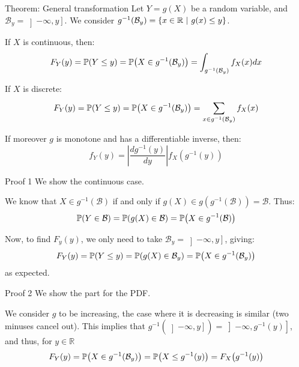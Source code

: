 \documentclass[a4paper]{article}
\begin{document}
\begin{parag}{Theorem: General transformation}
    Let $Y = g\left(X\right)$ be a random variable, and $\mathcal{B}_y = \left]-\infty, y\right] $. We consider $g^{-1}\left(\mathcal{B}_y\right) = \left\{x \in \mathbb{R} \suchthat g\left(x\right) \leq y\right\}$.

    If $X$ is continuous, then: 
    \[F_Y\left(y\right) = \prob\left(Y \leq y\right) = \prob\left(X \in g^{-1}\left(\mathcal{B}_y\right)\right) = \int_{g^{-1}\left(\mathcal{B}_y\right)} f_X\left(x\right)dx\]

    If $X$ is discrete:
    \[F_Y\left(y\right) = \prob\left(Y \leq y\right) = \prob\left(X \in g^{-1}\left(\mathcal{B}_y\right)\right) = \sum_{x \in g^{-1}\left(\mathcal{B}_y\right)}^{} f_X\left(x\right)\]

    If moreover $g$ is monotone and has a differentiable inverse, then: 
    \[f_Y\left(y\right) = \left|\frac{dg^{-1}\left(y\right)}{dy}\right| f_X\left(g^{-1}\left(y\right)\right)\]


    \begin{subparag}{Proof 1}
        We show the continuous case.

        We know that $X \in g^{-1}\left(\mathcal{B}\right)$ if and only if $g\left(X\right) \in g\left(g^{-1}\left(\mathcal{B}\right)\right) = \mathcal{B}$. Thus: 
        \[\prob\left(Y \in \mathcal{B}\right) = \prob\left(g\left(X\right) \in \mathcal{B}\right) = \prob\left(X \in g^{-1}\left(\mathcal{B}\right)\right)\]
        
        Now, to find $F_y\left(y\right)$, we only need to take $\mathcal{B}_y = \left]-\infty, y\right] $, giving: 
        \[F_Y\left(y\right) = \prob\left(Y \leq y\right) = \prob\left(g\left(X\right) \in \mathcal{B}_y\right) = \prob\left(X \in g^{-1}\left(\mathcal{B}_y\right)\right)\]
        as expected.
    \end{subparag}
    
    \begin{subparag}{Proof 2}
        We show the part for the PDF.

        We consider $g$ to be increasing, the case where it is decreasing is similar (two minuses cancel out). This implies that $g^{-1}\left(\left]-\infty, y\right] \right) = \left]-\infty, g^{-1}\left(y\right)\right] $, and thus, for $y \in \mathbb{R}$
        \[F_Y\left(y\right) = \prob\left(X \in g^{-1}\left(\mathcal{B}_y\right)\right) = \prob\left(X \leq g^{-1}\left(y\right)\right) = F_X\left(g^{-1}\left(y\right)\right)\]
    

\end{subparag}
\end{parag}
\end{document}
